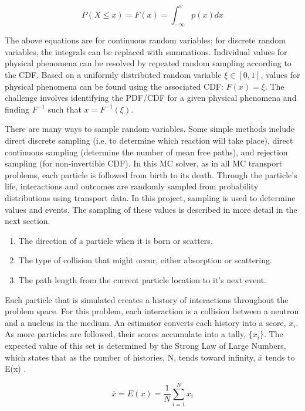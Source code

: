 \documentclass[11pt, oneside]{article}   	%
\newcommand*\mean[1]{\overline{#1}}				%
\begin{document}
\begin{equation}
P(X \leq x) = F(x) = \int_{-\infty}^{x}p(x)dx
\end{equation}

The above equations are for continuous random variables; for discrete random variables, the integrals can be replaced with summations. Individual values for physical phenomena can be resolved by repeated random sampling according to the CDF. Based on a uniformly distributed random variable $\xi \in [0, 1]$, values for physical phenomena can be found using the associated CDF: $F(x) = \xi$. The challenge involves identifying the PDF/CDF for a given physical phenomena and finding $F^{-1}$ such that $x = F^{-1}(\xi)$.

There are many ways to sample random variables. Some simple methods include direct discrete sampling (i.e. to determine which reaction will take place), direct continuous sampling (determine the number of mean free paths), and rejection sampling (for non-invertible CDF). In this MC solver, as in all MC transport problems, each particle is followed from birth to its death. Through the particle's life, interactions and outcomes are randomly sampled from probability distributions using transport data. In this project, sampling is used to determine values and events. The sampling of these values is described in more detail in the next section. 

\begin{enumerate}
\item The direction of a particle when it is born or scatters.
\item The type of collision that might occur, either absorption or scattering.
\item The path length from the current particle location to it's next event.
\end{enumerate}

Each particle that is simulated creates a history of interactions throughout the problem space. For this problem, each interaction is a collision between a neutron and a nucleus in the medium. An estimator converts each history into a score, $x_{i}$. As more particles are followed, their scores accumulate into a tally, $\{x_{i}\}$. The expected value of this set is determined by the Strong Law of Large Numbers, which states that as the number of histories, N, tends toward infinity, $\mean{x}$ tends to E(x) \cite{MCNP}.

\begin{equation}
\mean{x} = E(x) = \frac{1}{N}\sum_{i=1}^{N}x_{i}
\end{equation}
\end{document}
